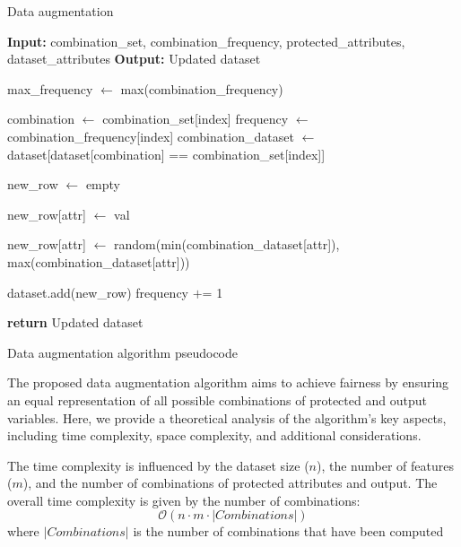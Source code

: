 \begin{algorithm}
    \caption{Data augmentation}
    \begin{algorithmic}[1]
        \State \textbf{Input:} combination\_set, combination\_frequency, protected\_attributes, dataset\_attributes
        \State \textbf{Output:} Updated dataset

        \State max\_frequency $\gets$ max(combination\_frequency)

            \State combination $\gets$ combination\_set[index]
            \State frequency $\gets$ combination\_frequency[index]
            \State combination\_dataset $\gets$ dataset[dataset[combination] == combination\_set[index]]

                \State new\_row $\gets$ empty

                    \State new\_row[attr] $\gets$ val
                \EndFor

                    \State new\_row[attr] $\gets$ random(min(combination\_dataset[attr]), max(combination\_dataset[attr]))
                \EndFor

                \State dataset.add(new\_row)
                \State frequency $+$= 1
            \EndWhile
        \EndFor

        \State \textbf{return} Updated dataset
    \end{algorithmic}
    \caption{Data augmentation algorithm pseudocode}
    \label{alg:prepro}
\end{algorithm}

The proposed data augmentation algorithm aims to achieve fairness by ensuring an equal representation of all possible combinations of protected and output variables. Here, we provide a theoretical analysis of the algorithm's key aspects, including time complexity, space complexity, and additional considerations.

The time complexity is influenced by the dataset size ($n$), the number of features ($m$), and the number of combinations of protected attributes and output. The overall time complexity is given by the number of combinations:
\[
\mathcal{O}(n \cdot m \cdot |Combinations|)
\]
where $|Combinations|$ is the number of combinations that have been computed

